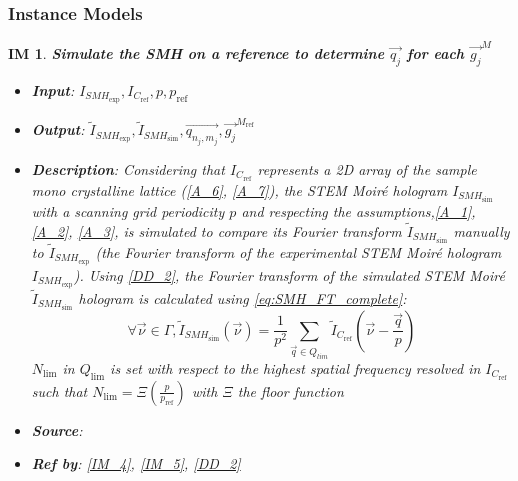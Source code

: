 \documentclass[12pt]{article}
\newtheorem{IM}{IM}
\begin{document}
\subsubsection{Instance Models} \label{sec_instance}    

\renewcommand{\labelitemi}{$-$}

\begin{IM}
\label{IM_1}
\noindent\colorbox{shadecolorIM}{\normalfont \textbf{Simulate the SMH on a 
reference to determine $\overrightarrow{q_{j}}$ for each 
$\overrightarrow{g_j}^{M}$}}
\normalfont
\begin{itemize}
\item \textbf{Input}: $I_{\mathit{SMH}_{\text{exp}}},I_{C_{\text{ref}}}, p, 
p_{\text{ref}}$
\item \textbf{Output}: $\widetilde{I}_{\mathit{SMH}_{\text{exp}}}, 
\widetilde{I}_{\mathit{SMH}_{\text{sim}}}, \overrightarrow{q_{n_j,m_j}}, 
\overrightarrow{g_j}^{M_{\text{ref}}}$
\item \textbf{Description}: Considering that $I_{C_{\text{ref}}}$ represents a 
2D array of the sample mono crystalline lattice (\cref{A_6}, \cref{A_7}), the 
STEM Moir{\'e} hologram $I_{\mathit{SMH}_{\text{sim}}}$ with a scanning grid 
periodicity $p$ and respecting the assumptions,\cref{A_1}, \cref{A_2}, 
\cref{A_3}, is simulated to compare its Fourier transform 
$\widetilde{I}_{\mathit{SMH}_{\text{sim}}}$ manually to 
$\widetilde{I}_{\mathit{SMH}_{\text{exp}}}$ (the Fourier transform of the 
experimental STEM Moir{\'e} hologram $I_{\mathit{SMH}_{\text{exp}}}$). Using 
\cref{DD_2}, the Fourier transform of the simulated STEM Moir{\'e} 
$\widetilde{I}_{\mathit{SMH}_{\text{sim}}}$ hologram is calculated using 
\cref{eq:SMH_FT_complete}:
\begin{equation}
\forall \vec{\nu} \in \Gamma, 
\widetilde{I}_{\mathit{SMH}_{\text{sim}}}(\vec{\nu})=\frac{1}{p^2}\sum_{\vec{q}\in 
Q_{lim}}\widetilde{I}_{C_{\text{ref}}}(\vec{\nu}-\frac{\vec{q}}{p})
\end{equation}
$N_{\text{lim}}$ in $Q_{\text{lim}}$ is set with respect to the highest spatial 
frequency resolved in  $I_{C_{\text{ref}}}$ such that 
$N_{\text{lim}}=\Xi(\frac{p}{p_{\text{ref}}})$ with $\Xi$ the floor function 

\item \textbf{Source}: \cite{Pofelski2018}
\item \textbf{Ref by}: \cref{IM_4}, \cref{IM_5}, \cref{DD_2}
\end{itemize}
\end{IM}
\end{document}
